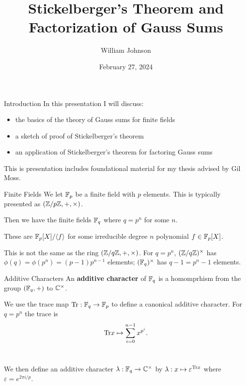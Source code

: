 \documentclass[presentation]{beamer}
\title[] %
{Stickelberger's Theorem and Factorization of Gauss Sums
}
\author[WJ]
{William Johnson
}
\institute[2024] 
{
 University of Maine
}
\date[Thesis 2024]
{February 27, 2024}
\begin{document}
\frame{\titlepage}


\begin{frame}{Introduction}
\bigskip
In this presentation I will discuss:
\begin{itemize}
    \item the basics of the theory of Gauss sums for finite fields
    
    \pause
    
    \item a sketch of proof of Stickelberger's theorem 
    \pause 
    
    \item an application of Stickelberger's theorem for factoring Gauss sums
    \pause 
\end{itemize}
\bigskip
This is presentation includes foundational material for my thesis advised by Gil Moss. 
\end{frame}


\begin{frame}{Finite Fields}
We let $\mathbb{F}_p$ be a finite field with $p$ elements. This is typically presented as $(\mathbb{Z} / p \mathbb{Z}, +, \times)$.\\

\pause
\vspace{0.5cm}

Then we have the finite fields $\mathbb{F}_q$ where $q = p^n$ for some $n$. 

\pause
\vspace{0.5cm}

These are $\mathbb{F}_p[X]/\langle f \rangle$ for some irreducible degree $n$ polynomial $f \in \mathbb{F}_p[X]$. \\

\pause
\vspace{0.5cm}

This is not the same as the ring $(\mathbb{Z}/ q \mathbb{Z}, +, \times)$. For $q = p^n$, $(\mathbb{Z}/q\mathbb{Z})^\times$ has $\phi(q) = \phi(p^n) = (p-1)p^{n-1}$ elements; $(\mathbb{F}_q)^\times$ has $q-1 = p^n - 1$ elements.
\end{frame}

\begin{frame}{Additive Characters}
An \textbf{additive character} of $\mathbb{F}_q$ is a homomprhism from the group $(\mathbb{F}_q, +)$ to $\mathbb{C}^\times$. \\

\pause 
\vspace{0.5cm}

We use the trace map $\textrm{Tr} : \mathbb{F}_q \to \mathbb{F}_p$ to define a canonical additive character. For $q = p^n$ the trace is \[\textrm{Tr} x \mapsto \sum_{i=0}^{n-1} x^{p^i}.\]\\

\pause 
\vspace{0.5cm}

We then define an additive character $\lambda : \mathbb{F}_q \to \mathbb{C}^\times$ by $\lambda : x \mapsto \varepsilon^{\textrm{Tr} x}$ where $\varepsilon = e^{2 \pi i /p}$. 

\end{frame}
\end{document}
